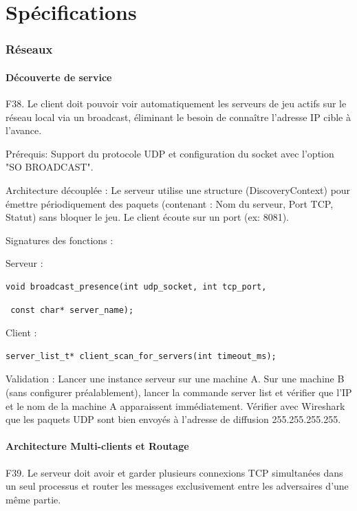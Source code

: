 \documentclass[12pt,a4paper,titlepage,oneside]{article}
\begin{document}
    
    \newpage
    \part{Spécifications} 
    \section{Réseaux}
    \subsection{Découverte de service}
    F38. Le client doit pouvoir voir automatiquement les serveurs de jeu actifs sur le réseau local via un broadcast, éliminant le besoin de connaître l'adresse IP cible à l'avance.

    Prérequis: Support du protocole UDP et configuration du socket avec l'option "SO BROADCAST".
      
    Architecture découplée : Le serveur utilise une structure (DiscoveryContext) pour émettre périodiquement des paquets (contenant : Nom du serveur, Port TCP, Statut) sans bloquer le jeu. Le client écoute sur un port  (ex: 8081). 
    
    Signatures des fonctions :
    
    Serveur : \begin{verbatim}void broadcast_presence(int udp_socket, int tcp_port,\end{verbatim} \smallskip \begin{verbatim} const char* server_name);\end{verbatim}
    
    Client : \begin{verbatim}server_list_t* client_scan_for_servers(int timeout_ms);\end{verbatim}
    
    Validation : Lancer une instance serveur sur une machine A. Sur une machine B (sans configurer préalablement), lancer la commande server list et vérifier que l'IP et le nom de la machine A apparaissent immédiatement. Vérifier avec Wireshark que les paquets UDP sont bien envoyés à l'adresse de diffusion 255.255.255.255.
    
    \subsection{Architecture Multi-clients et Routage} 
    F39. Le serveur doit avoir et garder plusieurs connexions TCP simultanées dans un seul processus et router les messages exclusivement entre les adversaires d'une même partie.
    
\end{document}
